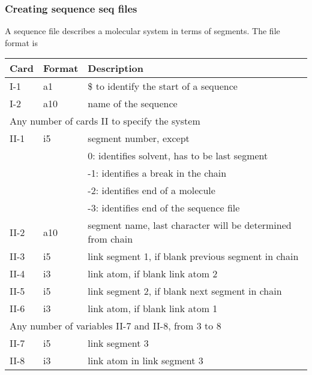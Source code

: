 \subsubsection{Creating sequence {\bf seq} files}
A sequence file describes a molecular system in terms of segments. The
file format is
\begin{center}
\begin{tabular}{lll}
\hline\hline
Card & Format & Description \\ \hline
I-1  & a1     & \$ to identify the start of a sequence \\
I-2  & a10    & name of the sequence\\
\multicolumn{3}{l}{Any number of cards II to specify the system} \\
II-1 & i5     & segment number, except\\
     &        &  0: identifies solvent, has to be last segment\\
     &        & -1: identifies a break in the chain\\
     &        & -2: identifies end of a molecule\\
     &        & -3: identifies end of the sequence file\\
II-2 & a10    & segment name, last character will be determined from chain\\
II-3 & i5     & link segment 1, if blank previous segment in chain\\
II-4 & i3     & link atom, if blank link atom 2\\
II-5 & i5     & link segment 2, if blank next segment in chain\\
II-6 & i3     & link atom, if blank link atom 1\\
\multicolumn{3}{l}{Any number of variables II-7 and II-8, from 3 to 8 } \\
II-7 & i5     & link segment 3\\
II-8 & i3     & link atom in link segment 3\\
\hline\hline
\end{tabular}
\end{center}
